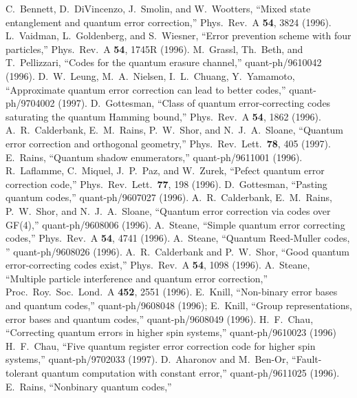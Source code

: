 \begin{thebibliography}{99}
	 C.~Bennett, D.~DiVincenzo, J.~Smolin, and W.~Wootters,
	``Mixed state entanglement and quantum error correction,'' Phys.\ Rev.\ A
		{\bf 54}, 3824 (1996).
	 L.~Vaidman, L.~Goldenberg, and S.~Wiesner, ``Error prevention
	scheme with four particles,'' Phys.\ Rev.\ A {\bf 54}, 1745R (1996).
	 M.~Grassl, Th.~Beth, and T.~Pellizzari, ``Codes for the
	quantum erasure channel,'' quant-ph/9610042 (1996).
	 D.~W.~Leung, M.~A.~Nielsen, I.~L.~Chuang, Y.~Yamamoto,
	``Approximate quantum error correction can lead to better codes,''
	quant-ph/9704002 (1997).
	 D.~Gottesman, ``Class of quantum error-correcting
	codes saturating the quantum Hamming bound,'' Phys.\ Rev.\ A {\bf 54}, 1862
	(1996).
	 A.~R.~Calderbank, E.~M.~Rains, P.~W.~Shor, and
	N.~J.~A.~Sloane, ``Quantum error correction and orthogonal geometry,'' Phys.\
	Rev.\ Lett.\ {\bf 78}, 405 (1997).
	 E.~Rains, ``Quantum shadow enumerators,''
	quant-ph/9611001 (1996).
	 R.~Laflamme, C.~Miquel, J.~P.~Paz, and W.~Zurek,
	``Pefect quantum error correction code,'' Phys.\ Rev.\ Lett.\ {\bf 77}, 198
	(1996).
	 D.~Gottesman, ``Pasting quantum codes,''
	quant-ph/9607027 (1996).
	 A.~R.~Calderbank, E.~M.~Rains, P.~W.~Shor, and
	N.~J.~A.~Sloane, ``Quantum error correction via codes over GF(4),''
	quant-ph/9608006 (1996).
	 A.~Steane, ``Simple quantum error correcting codes,''
	Phys.\ Rev.\ A {\bf 54}, 4741 (1996).
	 A.~Steane, ``Quantum Reed-Muller codes, ''
	quant-ph/9608026 (1996).
	 A.~R.~Calderbank and P.~W.~Shor, ``Good quantum
	error-correcting codes exist,'' Phys.\ Rev.\ A {\bf 54}, 1098 (1996).
	\bibitem{steane-CSS} A.~Steane, ``Multiple particle interference and quantum
	error correction,'' Proc.\ Roy.\ Soc.\ Lond.\ A {\bf 452}, 2551 (1996).
	\bibitem{knill-qudit} E.~Knill, ``Non-binary error bases and quantum codes,''
	quant-ph/9608048 (1996); E.~Knill, ``Group representations, error bases and
	quantum codes,'' quant-ph/9608049 (1996).
	 H.~F.~Chau, ``Correcting quantum errors in higher spin
	systems,'' quant-ph/9610023 (1996)
	 H.~F.~Chau, ``Five quantum register error correction
	code for higher spin systems,'' quant-ph/9702033 (1997).
	 D.~Aharonov and M.~Ben-Or, ``Fault-tolerant quantum
	computation with constant error,'' quant-ph/9611025 (1996).
	 E.~Rains, ``Nonbinary quantum codes,''

\end{thebibliography}
